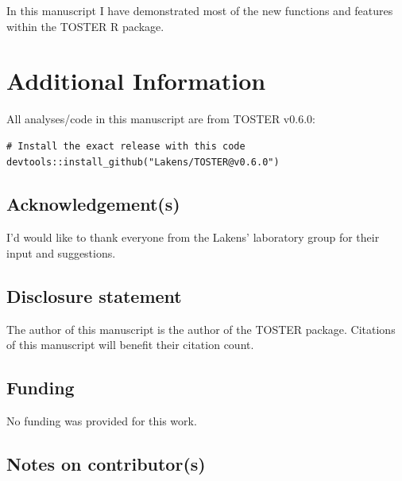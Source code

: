 \documentclass[]{interact}
\theoremstyle{plain}%
\theoremstyle{definition}
\theoremstyle{remark}
\begin{document}
In this manuscript I have demonstrated most of the new functions and
features within the TOSTER R package.

\newpage

\hypertarget{additional-information}{%
\section{Additional Information}\label{additional-information}}

All analyses/code in this manuscript are from TOSTER v0.6.0:

\begin{verbatim}
# Install the exact release with this code
devtools::install_github("Lakens/TOSTER@v0.6.0")
\end{verbatim}

\hypertarget{acknowledgements}{%
\subsection*{Acknowledgement(s)}\label{acknowledgements}}

I'd would like to thank everyone from the Lakens' laboratory group for
their input and suggestions.

\hypertarget{disclosure-statement}{%
\subsection*{Disclosure statement}\label{disclosure-statement}}

The author of this manuscript is the author of the TOSTER package.
Citations of this manuscript will benefit their citation count.

\hypertarget{funding}{%
\subsection*{Funding}\label{funding}}

No funding was provided for this work.

\hypertarget{notes-on-contributors}{%
\subsection*{Notes on contributor(s)}\label{notes-on-contributors}}
\end{document}
